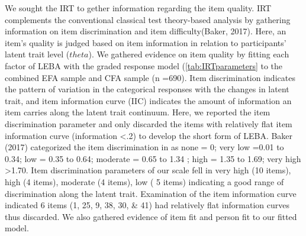 \documentclass[
  english,
  man]{apa6}
\begin{document}
We sought the IRT to gether information regarding the item quality. IRT complements the conventional classical test theory-based analysis by gathering information on item discrimination and item difficulty(Baker, 2017). Here, an item's quality is judged based on item information in relation to participants' latent trait level (\(theta\)). We gathered evidence on item quality by fitting each factor of LEBA with the graded response model (\ref{tab:IRTparameters} to the combined EFA sample and CFA sample (n =690). Item discrimination indicates the pattern of variation in the categorical responses with the changes in latent trait, and item information curve (IIC) indicates the amount of information an item carries along the latent trait continuum. Here, we reported the item discrimination parameter and only discarded the items with relatively flat item information curve (information \textless.2) to develop the short form of LEBA. Baker (2017) categorized the item discrimination in as none = 0; very low =0.01 to 0.34; low = 0.35 to 0.64; moderate = 0.65 to 1.34 ; high = 1.35 to 1.69; very high \textgreater1.70. Item discrimination parameters of our scale fell in very high (10 items), high (4 items), moderate (4 items), low ( 5 items) indicating a good range of discrimination along the latent trait. Examination of the item information curve indicated 6 items (1, 25, 9, 38, 30, \& 41) had relatively flat information curves thus discarded. We also gathered evidence of item fit and person fit to our fitted model.
\end{document}
